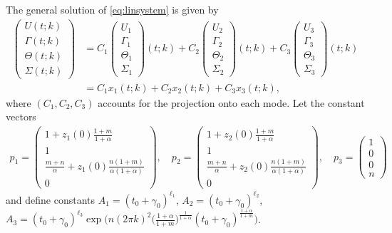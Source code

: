 \documentclass[a4paper,11pt]{article}
\theoremstyle{remark}
\begin{document}
The general solution of \eqref{eq:linsystem} is given by
\begin{align*}
 \begin{pmatrix}
  U(t;k)\\ \Gamma(t;k) \\ \Theta(t;k) \\ \Sigma(t;k)
 \end{pmatrix}
 &= C_1  \begin{pmatrix}  U_1\\ \Gamma_1 \\ \Theta_1 \\ \Sigma_1 \end{pmatrix}(t;k)
 + C_2  \begin{pmatrix}  U_2\\ \Gamma_2 \\ \Theta_2 \\ \Sigma_2 \end{pmatrix}(t;k)
 + C_3  \begin{pmatrix}  U_3\\ \Gamma_3 \\ \Theta_3 \\ \Sigma_3 \end{pmatrix}(t;k)\\
 &=C_1x_1(t;k) + C_2x_2(t;k) + C_3 x_3(t;k),
\end{align*}
where $(C_1,C_2,C_3)$ accounts for the projection onto each mode. Let the constant vectors
\begin{align*}
 p_1=\begin{pmatrix} 1+z_1(0)\frac{1+m}{1+\alpha} \\ 1 \\ \frac{m+n}{\alpha} + z_1(0)\frac{n(1+m)}{\alpha(1+\alpha)} \\ 0 \end{pmatrix}, \quad p_2 = \begin{pmatrix} 1+z_2(0)\frac{1+m}{1+\alpha} \\ 1 \\ \frac{m+n}{\alpha} + z_2(0)\frac{n(1+m)}{\alpha(1+\alpha)} \\ 0 \end{pmatrix}, \quad p_3 = \begin{pmatrix} 1 \\ 0 \\ 0 \\ n \end{pmatrix}
\end{align*}
and define constants $A_1 = (t_0 + \gamma_0)^{\ell_1}$, $A_2 = (t_0 + \gamma_0)^{\ell_2}$, $A_3 = (t_0 + \gamma_0)^{\ell_3}\exp\Big(n(2\pi k)^2 \big(\frac{1+\alpha}{1+m}\big)^{\frac{1}{1+\alpha}}(t_0+\gamma_0)^{\frac{1+\alpha}{1+m}}\Big)$.
\end{document}
